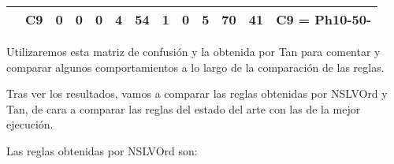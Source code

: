 \begin{table}[H]
{\begin{tabular}{|ccccccccccccc|}
\multicolumn{1}{|c|}{}                                      & \multicolumn{1}{c|}{C9} & \multicolumn{1}{c|}{0}  & \multicolumn{1}{c|}{0}  & \multicolumn{1}{c|}{0}  & \multicolumn{1}{c|}{\textbf{4}}  & \multicolumn{1}{c|}{\textbf{54}} & \multicolumn{1}{c|}{\textbf{1}}  & \multicolumn{1}{c|}{0}  & \multicolumn{1}{c|}{\textbf{5}}  & \multicolumn{1}{c|}{\textbf{70}} & \multicolumn{1}{c|}{\textbf{41}} & C9 = Ph10-50-     \\ \hline
\end{tabular}%
}
\end{table}


Utilizaremos esta matriz de confusión y la obtenida por Tan para comentar y comparar algunos comportamientos a lo largo de la comparación de las reglas.

Tras ver los resultados, vamos a comparar las reglas obtenidas por NSLVOrd y Tan, de cara a comparar las reglas del estado del arte con las de la mejor ejecución.

Las reglas obtenidas por NSLVOrd son:

